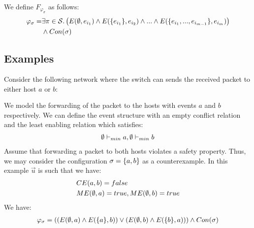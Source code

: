 \documentclass{article}
\begin{document}
We define $F_{\varphi_{\sigma}}$ as follows:
\begin{align*}
    \varphi_{\sigma} = &
    \exists \pi \in \mathcal{S}.
    \left(
    E(\emptyset, e_{i_1})
    \wedge E(\{e_{i_1}\}, e_{i_2} )
    \wedge ...
    \wedge E(\{e_{i_1},...,e_{i_{m-1}}\},e_{i_m})
    \right)
    \\
                       & \wedge Con(\sigma)
\end{align*}

\subsection{Examples}
\begin{example}
    Consider the following network where the switch can sends the
    received packet to either host $a$ or $b$:
    \begin{center}
    \end{center}
    We model the forwarding of the packet to the hosts with events
    $a$ and $b$ respectively.
    We can define the event structure with an empty conflict relation and the least enabling relation which satisfies:
    \begin{align*}
        \emptyset \vdash_{min} a, \emptyset \vdash_{min} b
    \end{align*}
    Assume that forwarding a packet to both hosts violates
    a safety property.
    Thus, we may consider the configuration $\sigma = \{a,b\}$ as
    a counterexample.
    In this example $\vec u$ is such that we have:
    \begin{align*}
         & CE(a,b) = false                   \\
         & ME(\emptyset, a) = true, ME(\emptyset,b) = true \\
    \end{align*}
    We have:
    \begin{align*}
        \varphi_{\sigma} & =
        \left(
        \left(
        E(\e, a) \wedge E(\s{a},b)
        \right)
        \vee
        \left(
        E(\e,b) \wedge E(\s{b},a)
        \right)
        \right)
        \wedge Con(\sigma)                                                       \\

\end{align*}
\end{example}
\end{document}
